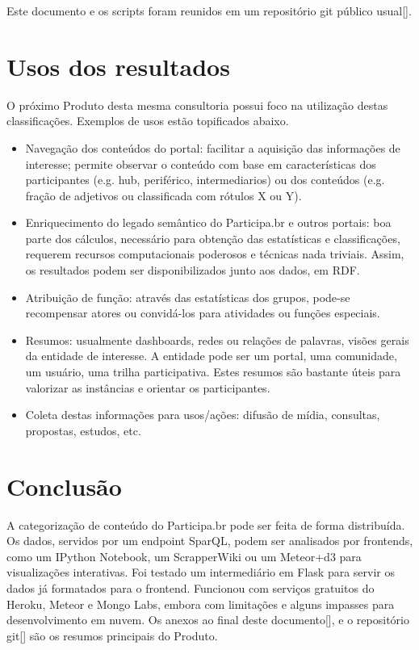 \documentclass[12pt]{article}
\begin{document}
Este documento e os scripts foram reunidos em um repositório git público usual[].

\section{Usos dos resultados}
O próximo Produto desta mesma consultoria possui foco na utilização destas classificações. Exemplos de usos estão topificados abaixo.
\begin{itemize}
    \item Navegação dos conteúdos do portal: facilitar a aquisição das informações de interesse; permite observar o conteúdo com base em características dos participantes (e.g. hub, periférico, intermediarios) ou dos conteúdos (e.g. fração de adjetivos ou classificada com rótulos X ou Y).
    \item Enriquecimento do legado semântico do Participa.br e outros portais: boa parte dos cálculos, necessário para obtenção das estatísticas e classificações, requerem recursos computacionais poderosos e técnicas nada triviais. Assim, os resultados podem ser disponibilizados junto aos dados, em RDF.
    \item Atribuição de função: através das estatísticas dos grupos, pode-se recompensar atores  ou convidá-los para atividades ou funções especiais.
    \item Resumos: usualmente dashboards, redes ou relações de palavras, visões gerais da entidade de interesse. A entidade pode ser um portal, uma comunidade, um usuário, uma trilha participativa. Estes resumos são bastante úteis para valorizar as instâncias e orientar os participantes.
    \item Coleta destas informações para usos/ações: difusão de mídia, consultas, propostas, estudos, etc.
\end{itemize}

\section{Conclusão}
A categorização de conteúdo do Participa.br pode ser feita de forma distribuída. Os dados, servidos por um endpoint SparQL, podem ser analisados por frontends, como um IPython Notebook, um ScrapperWiki ou um Meteor+d3 para visualizações interativas. Foi testado um intermediário em Flask para servir os dados já formatados para o frontend. Funcionou com serviços gratuitos do Heroku, Meteor e Mongo Labs, embora com limitações e alguns impasses para desenvolvimento em nuvem. Os anexos ao final deste documento[], e o repositório git[] são os resumos principais do Produto.
\end{document}
